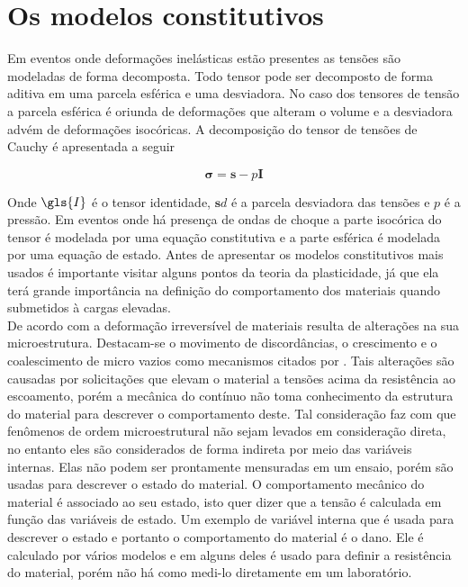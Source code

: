 \chapter{Os modelos constitutivos} \label{Cap: ModConst}

Em eventos onde deformações inelásticas estão presentes as tensões são modeladas de forma decomposta. Todo tensor pode ser decomposto de forma aditiva em uma parcela esférica e uma desviadora. No caso dos tensores de tensão a parcela esférica é oriunda de deformações que alteram o volume e a desviadora advém de deformações isocóricas. A decomposição do tensor de tensões de Cauchy é apresentada a seguir

\begin{equation} 
    \boldsymbol{\sigma} = \boldsymbol{s} - p\boldsymbol{I}
\end{equation}

Onde $ \gls{I} $ é o tensor identidade, $\boldsymbol{s}d$ é a parcela desviadora das tensões e $p$ é a pressão. Em eventos onde há presença de ondas de choque a parte isocórica do tensor é modelada por uma equação constitutiva e a parte esférica é modelada por uma equação de estado. Antes de apresentar os modelos constitutivos mais usados é importante visitar alguns pontos da teoria da plasticidade, já que ela terá grande importância na definição do comportamento dos materiais quando submetidos à cargas elevadas. \\

De acordo com \cite{hiermaier_2008} a deformação irreversível de materiais resulta de alterações na sua microestrutura. Destacam-se o movimento de discordâncias, o crescimento e o coalescimento de micro vazios como mecanismos citados por \cite{hiermaier_2008}. Tais alterações são causadas por solicitações que elevam o material a tensões acima da resistência  ao escoamento, porém a mecânica do contínuo não toma conhecimento da estrutura do material para descrever o comportamento deste. Tal consideração faz com que fenômenos de ordem microestrutural não sejam levados em consideração direta, no entanto eles são considerados de forma indireta por meio das variáveis internas. Elas não podem ser prontamente mensuradas em um ensaio, porém são usadas para descrever o estado do material. O comportamento mecânico do material é associado ao seu estado, isto quer dizer que a tensão é calculada em função das variáveis de estado. Um exemplo de variável interna que é usada para descrever o estado e portanto o comportamento do material é o dano. Ele é calculado por vários modelos e em alguns deles é usado para definir a resistência do material, porém não há como medi-lo diretamente em um laboratório. \\

